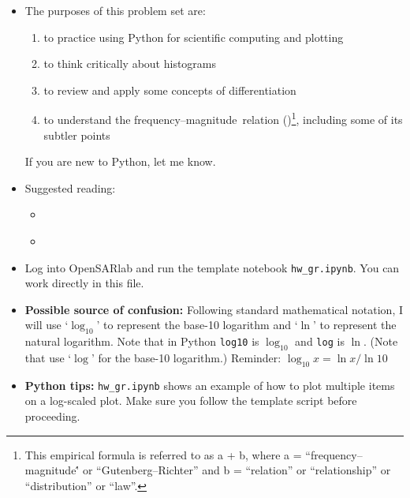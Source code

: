 \documentclass[11pt,titlepage,fleqn]{article}
\newcommand{\fmag}{frequency--magnitude}
\begin{document}
\begin{itemize}

\item The purposes of this problem set are:
%
\begin{enumerate}
\item to practice using Python for scientific computing and plotting
\item to think critically about histograms
\item to review and apply some concepts of differentiation
\item to understand the \fmag\ relation ()\footnote{This empirical formula is referred to as a + b, where a = ``\fmag\'' or ``Gutenberg--Richter'' and b = ``relation'' or ``relationship'' or ``distribution'' or ``law''.}, including some of its subtler points
\end{enumerate}
%
If you are new to Python, let me know.

\item Suggested reading:
\begin{itemize}
\item \citet[][Section 4.7.1]{SteinWysession}
\item \citet{GutenbergRichter1944}
\end{itemize}


\item Log into OpenSARlab and run the template notebook \verb+hw_gr.ipynb+. You can work directly in this file.

\item {\bf Possible source of confusion:} Following standard mathematical notation, I will use `$\log_{10}$' to represent the base-10 logarithm and `$\ln$' to represent the natural logarithm. Note that in Python \verb+log10+ is $\log_{10}$ and \verb+log+ is $\ln$. (Note that \citet{SteinWysession} use `$\log$' for the base-10 logarithm.) Reminder: $\log_{10} x = \ln x / \ln 10$

\item {\bf Python tips:}
\verb+hw_gr.ipynb+ shows an example of how to plot multiple items on a log-scaled plot.
Make sure you follow the template script before proceeding.


\end{itemize}
\end{document}
